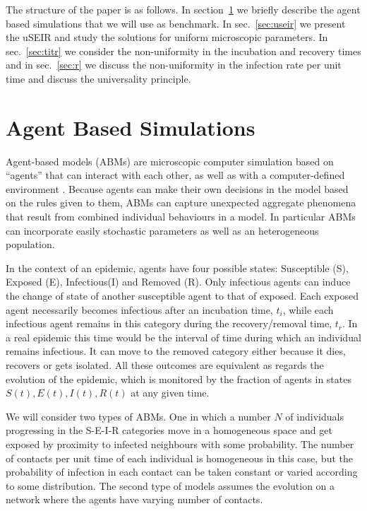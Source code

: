 \documentclass[a4paper,oneside,11pt]{article}
\begin{document}
The structure of the paper is as follows. In section~\ref{sec:ABM} we briefly describe the agent based simulations that we will use as benchmark.
In sec.~\ref{sec:useir} we present the uSEIR and study the solutions for uniform microscopic parameters. In sec.~\ref{sec:titr} we consider the
non-uniformity in the incubation and recovery times and in sec.~\ref{sec:r} we discuss the non-uniformity in the infection rate per unit time and discuss the universality principle.

\section{Agent Based Simulations}
\label{sec:ABM}

Agent-based models (ABMs) are microscopic computer simulation based on ``agents'' that can interact with each other, as well as with a computer-defined environment \cite{Hunter2017}. Because agents can make their own decisions in the model based on the rules given to them, ABMs can capture unexpected aggregate phenomena that result from combined individual behaviours in a model. In particular ABMs can incorporate easily stochastic parameters as well as an heterogeneous population.

In the context of an epidemic, agents have four possible states: Susceptible (S), Exposed (E), Infectious(I) and Removed (R). Only infectious agents can induce the change of state of another susceptible agent to that of exposed. Each exposed agent necessarily becomes infectious after an incubation time, $t_i$, while each infectious agent remains in this category during the recovery/removal time, $t_r$. In a real epidemic this time would be the interval of time during which an individual remains infectious. It can move to the removed
category either because it dies, recovers or gets isolated. All these outcomes are equivalent as regards the evolution of the epidemic, which 
 is monitored by the fraction of agents in states $S(t), E(t), I(t), R(t)$ at any given time. 

We will consider two types of ABMs. One in which a number $N$ of individuals progressing in the S-E-I-R categories move in a homogeneous space and get exposed by proximity to infected neighbours with some probability. The number of contacts per unit time of each individual is homogeneous in this case, but the probability of infection in each contact can be taken constant or varied according to some distribution.
The second type of models assumes the evolution  on a network where the agents have varying number of contacts. 
\end{document}

